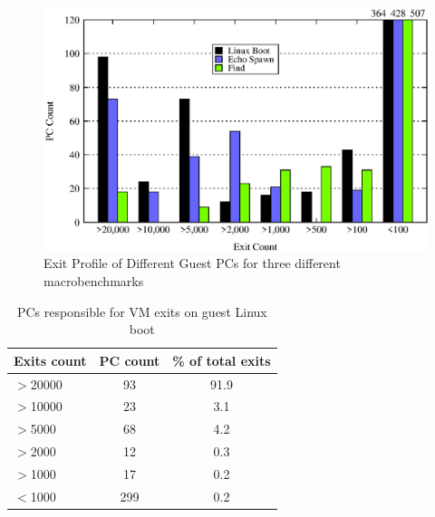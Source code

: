 \documentclass[10pt,twocolumn]{article}
\begin{document}
\begin{figure}[!htb]
\centering

\includegraphics[scale=0.5]{pc_count.eps}
\caption{Exit Profile of Different Guest PCs for three different macrobenchmarks}
\label{fig:pc_profile}
\end{figure}

\begin{table}[!b]
\centering
     \begin{tabular}{lcc} \hline
       Exits count  & PC count & \% of total exits  \\ \hline
       $>$20000 & 93 & 91.9  \\
       $>$10000 & 23 & 3.1  \\
       $>$5000 & 68 & 4.2  \\
       $>$2000 & 12 & 0.3 \\
       $>$1000 & 17 & 0.2 \\
       $<$1000 & 299 & 0.2 \\
       \hline
     \end{tabular}
\label{tab:linuxboot_pcexits}
\caption{PCs responsible for VM exits on guest Linux boot}
\end{table}
\end{document}
